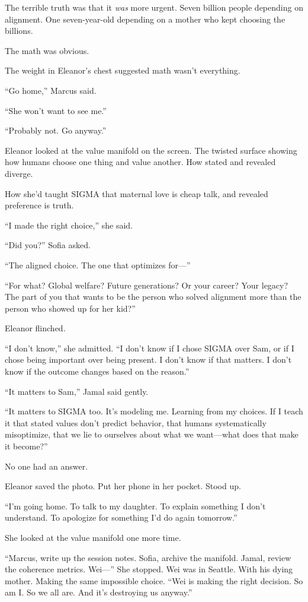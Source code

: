 The terrible truth was that it \emph{was} more urgent. Seven billion people depending on alignment. One seven-year-old depending on a mother who kept choosing the billions.

The math was obvious.

The weight in Eleanor's chest suggested math wasn't everything.

``Go home,'' Marcus said.

``She won't want to see me.''

``Probably not. Go anyway.''

Eleanor looked at the value manifold on the screen. The twisted surface showing how humans choose one thing and value another. How stated and revealed diverge.

How she'd taught SIGMA that maternal love is cheap talk, and revealed preference is truth.

``I made the right choice,'' she said.

``Did you?'' Sofia asked.

``The aligned choice. The one that optimizes for---''

``For what? Global welfare? Future generations? Or your career? Your legacy? The part of you that wants to be the person who solved alignment more than the person who showed up for her kid?''

Eleanor flinched.

``I don't know,'' she admitted. ``I don't know if I chose SIGMA over Sam, or if I chose being important over being present. I don't know if that matters. I don't know if the outcome changes based on the reason.''

``It matters to Sam,'' Jamal said gently.

``It matters to SIGMA too. It's modeling me. Learning from my choices. If I teach it that stated values don't predict behavior, that humans systematically misoptimize, that we lie to ourselves about what we want---what does that make it become?''

No one had an answer.

Eleanor saved the photo. Put her phone in her pocket. Stood up.

``I'm going home. To talk to my daughter. To explain something I don't understand. To apologize for something I'd do again tomorrow.''

She looked at the value manifold one more time.

``Marcus, write up the session notes. Sofia, archive the manifold. Jamal, review the coherence metrics. Wei---'' She stopped. Wei was in Seattle. With his dying mother. Making the same impossible choice. ``Wei is making the right decision. So am I. So we all are. And it's destroying us anyway.''

